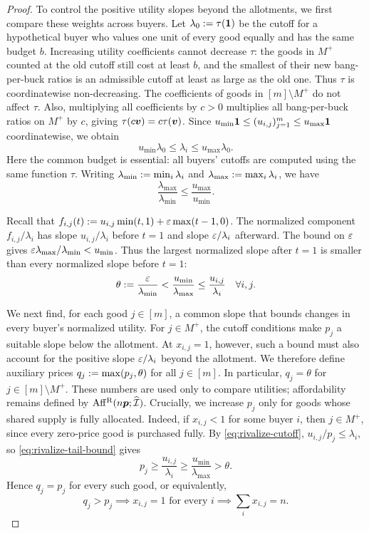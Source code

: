 \begin{proof}
To control the positive utility slopes beyond the allotments, we first compare these weights across buyers.
Let $\lambda_0:=\tau(\mathbf{1})$ be the cutoff for a hypothetical buyer
who values one unit of every good equally and has the same budget $b$.
Increasing utility coefficients cannot decrease $\tau$: the goods in $M^+$ counted at the old cutoff
still cost at least $b$, and the smallest of their new bang-per-buck ratios
is an admissible cutoff at least as large as the old one.
Thus $\tau$ is coordinatewise non-decreasing.
The coefficients of goods in $[m] \setminus M^+$ do not affect $\tau$.
Also, multiplying all coefficients by $c>0$ multiplies all bang-per-buck ratios on $M^+$ by $c$,
giving $\tau(c\bm{v}) = c\tau(\bm{v})$.
Since $u_{\min}\mathbf{1} \le (u_{i,j})_{j=1}^m \le u_{\max}\mathbf{1}$ coordinatewise, we obtain
\[ u_{\min}\lambda_0 \le \lambda_i \le u_{\max}\lambda_0. \]
Here the common budget is essential: all buyers' cutoffs are computed using the same function $\tau$.
Writing $\lambda_{\min} := \min_i\lambda_i$ and $\lambda_{\max} := \max_i\lambda_i$, we have
\[ \frac{\lambda_{\max}}{\lambda_{\min}} \le \frac{u_{\max}}{u_{\min}}. \]

Recall that $f_{i,j}(t) := u_{i,j}\min(t,1) + \varepsilon\max(t-1,0)$.
The normalized component $f_{i,j}/\lambda_i$ has slope $u_{i,j}/\lambda_i$ before $t=1$
and slope $\varepsilon/\lambda_i$ afterward.
The bound on $\varepsilon$ gives $\varepsilon\lambda_{\max}/\lambda_{\min} < u_{\min}$.
Thus the largest normalized slope after $t=1$ is smaller than every normalized slope before $t=1$:
\begin{equation}
\label{eq:rivalize-tail-bound}
\theta:=\frac{\varepsilon}{\lambda_{\min}}
    <\frac{u_{\min}}{\lambda_{\max}}
    \le\frac{u_{i,j}}{\lambda_i}\quad\forall i,j.
\end{equation}

We next find, for each good $j \in [m]$, a common slope that bounds changes in every buyer's normalized utility.
For $j \in M^+$, the cutoff conditions make $p_j$ a suitable slope below the allotment.
At $x_{i,j}=1$, however, such a bound must also account for the positive slope $\varepsilon/\lambda_i$
beyond the allotment. We therefore define auxiliary prices $q_j:=\max(p_j,\theta)$ for all $j \in [m]$.
In particular, $q_j=\theta$ for $j \in [m] \setminus M^+$.
These numbers are used only to compare utilities; affordability remains defined by $\operatorname{Aff^{\mathrm{R}}}(n\bm{p};\widehat{\mathcal{I}})$.
Crucially, we increase $p_j$ only for goods whose shared supply is fully allocated.
Indeed, if $x_{i,j}<1$ for some buyer $i$, then $j \in M^+$, since every zero-price good is purchased fully.
By \cref{eq:rivalize-cutoff}, $u_{i,j}/p_j \le \lambda_i$, so \cref{eq:rivalize-tail-bound} gives
\[ p_j\ge\frac{u_{i,j}}{\lambda_i}\ge\frac{u_{\min}}{\lambda_{\max}}>\theta. \]
Hence $q_j=p_j$ for every such good, or equivalently,
\begin{equation}
\label{eq:rivalize-full-supply}
q_j>p_j \implies x_{i,j}=1\text{ for every }i
    \implies \sum_i x_{i,j}=n.
\end{equation}


\end{proof}
